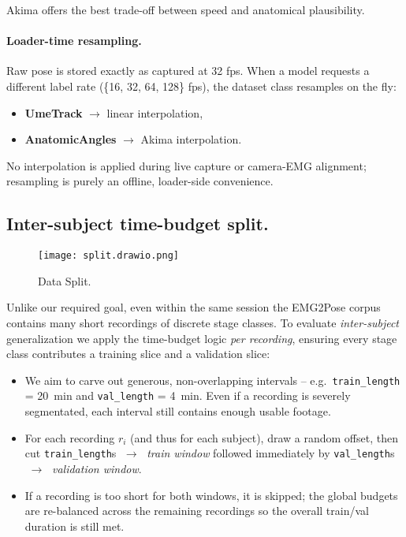 Akima offers the best trade-off between speed and anatomical plausibility.

\paragraph{Loader-time resampling.}
Raw pose is stored exactly as captured at 32 fps.
When a model requests a different label rate (\{16, 32, 64, 128\} fps),
the dataset class resamples on the fly:

\begin{itemize}
  \item \textbf{UmeTrack} $\to$ linear interpolation,
  \item \textbf{AnatomicAngles} $\to$ Akima interpolation.
\end{itemize}

No interpolation is applied during live capture or camera-EMG alignment;
resampling is purely an offline, loader-side convenience.

\subsection{Inter-subject time-budget split.}

\begin{figure}[H]
    \centering
    \texttt{[image: split.drawio.png]}
    \caption{Data Split.}
    \label{fig:split}
\end{figure}

Unlike our required goal, even within the same session the EMG2Pose corpus contains many short recordings of discrete stage classes.
To evaluate \emph{inter-subject} generalization we apply the time-budget logic \emph{per recording}, ensuring every stage class contributes
a training slice and a validation slice:

\begin{itemize}
  \item We aim to carve out generous, non-overlapping intervals -- 
        e.g.\ \texttt{train\_length} = \SI{20}{min} and
        \texttt{val\_length} = \SI{4}{min}.
        Even if a recording is severely segmentated, each interval still contains enough usable footage.

  \item For each recording $r_{i}$ (and thus for each subject), draw  
        a random offset, then cut
        \texttt{train\_length}s $\;\to\;$ \emph{train window}
        followed immediately by
        \texttt{val\_length}s $\;\to\;$ \emph{validation window}.

  \item If a recording is too short for both windows, it is skipped; the global
        budgets are re-balanced across the remaining recordings so the overall
        train/val duration is still met.
\end{itemize}

